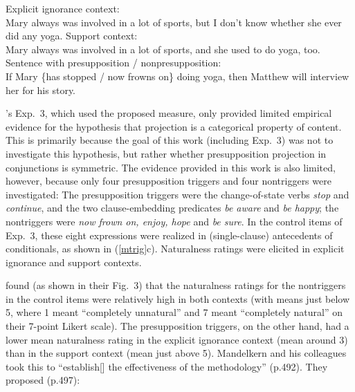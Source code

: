 \documentclass[11pt,fleqn]{article}
\newcommand{\6}{\mbox{$[\hspace*{-.6mm}[$}}
\newcommand{\9}{\mbox{$]\hspace*{-.6mm}]$}}
\newcommand{\citepos}[1]{\citeauthor{#1}'s \citeyear{#1}}
\begin{document}
\begin{exe}
\ex\label{mtrig} \citealt[490f.]{mandelkern-etal2020}
\begin{xlist}
\ex Explicit ignorance context: \\ Mary always was involved in a lot of sports, but I don't know whether she ever did any yoga.
\ex Support context: \\ Mary always was involved in a lot of sports, and she used to do yoga, too.
\ex Sentence with presupposition / nonpresupposition: \\ If Mary \{has stopped / now frowns on\} doing yoga, then Matthew will interview her for his story.
\end{xlist}
\end{exe}
\citepos{mandelkern-etal2020} Exp.~3, which used the proposed measure, only provided limited empirical evidence for the hypothesis that projection is a categorical property of content. This is primarily because the goal of this work (including Exp.~3) was not to investigate this hypothesis, but rather whether presupposition projection in conjunctions is symmetric. The evidence provided in this work is also limited, however, because only four presupposition triggers and four nontriggers were investigated: The presupposition triggers were the change-of-state verbs {\em stop} and {\em continue}, and the two clause-embedding predicates {\em be aware} and {\em be happy}; the nontriggers were {\em now frown on, enjoy, hope} and {\em be sure}.
%
In the control items of Exp.~3, these eight expressions were realized in (single-clause) antecedents of conditionals, as shown in (\ref{mtrig}c). Naturalness ratings were elicited in explicit ignorance and support contexts. 

\citealt{mandelkern-etal2020} found (as shown in their Fig.~3) that the naturalness ratings for the nontriggers in the control items were relatively high in both contexts (with means just below 5, where 1 meant ``completely unnatural'' and 7 meant ``completely natural'' on their 7-point Likert scale). The presupposition triggers, on the other hand, had a lower mean naturalness rating in the explicit ignorance context (mean around 3) than in the support context (mean just above 5). Mandelkern and his colleagues took this to ``establish[] the effectiveness of the methodology'' (p.492). They proposed (p.497):
\end{document}
